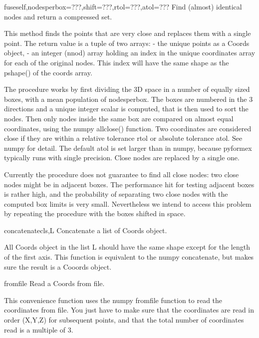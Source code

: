 \begin{funcdesc}{fuse}{self,nodesperbox=???,shift=???,rtol=???,atol=???}
Find (almost) identical nodes and return a compressed set.

        This method finds the points that are very close and replaces them
        with a single point. The return value is a tuple of two arrays:
        - the unique points as a Coords object,
        - an integer (nnod) array holding an index in the unique
        coordinates array for each of the original nodes. This index will
        have the same shape as the pshape() of the coords array.

        The procedure works by first dividing the 3D space in a number of
        equally sized boxes, with a mean population of nodesperbox.
        The boxes are numbered in the 3 directions and a unique integer scalar
        is computed, that is then used to sort the nodes.
        Then only nodes inside the same box are compared on almost equal
        coordinates, using the numpy allclose() function. Two coordinates are
        considered close if they are within a relative tolerance rtol or absolute
        tolerance atol. See numpy for detail. The default atol is set larger than
        in numpy, because pyformex typically runs with single precision.
        Close nodes are replaced by a single one.

        Currently the procedure does not guarantee to find all close nodes:
        two close nodes might be in adjacent boxes. The performance hit for
        testing adjacent boxes is rather high, and the probability of separating
        two close nodes with the computed box limits is very small. Nevertheless
        we intend to access this problem by repeating the procedure with the
        boxes shifted in space.
        
\end{funcdesc}

\begin{funcdesc}{concatenate}{cls,L}
Concatenate a list of Coords object.

        All Coords object in the list L should have the same shape
        except for the length of the first axis.
        This function is equivalent to the numpy concatenate, but makes
        sure the result is a Cooords object.
        
\classmethod
\end{funcdesc}

\begin{funcdesc}{fromfile}{}
Read a Coords from file.

        This convenience function uses the numpy fromfile function to read
        the coordinates from file.
        You just have to make sure that the coordinates are read in order
        (X,Y,Z) for subsequent points, and that the total number of
        coordinates read is a multiple of 3.
        
\classmethod
\end{funcdesc}

